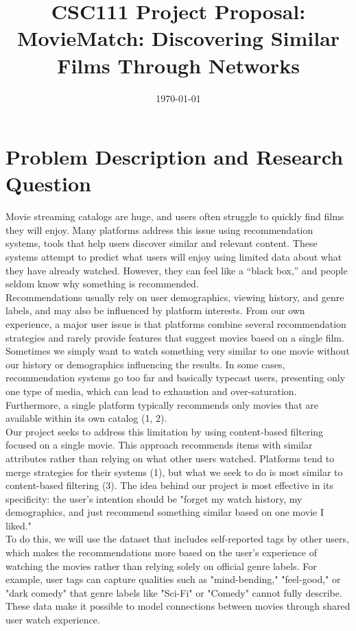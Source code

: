\documentclass[fontsize=11pt]{article}
\title{CSC111 Project Proposal:\\
\color{violet}\textbf{MovieMatch: Discovering Similar Films Through Networks}}
\date{\today}
\begin{document}
\maketitle

\section*{Problem Description and Research Question}

Movie streaming catalogs are huge, and users often struggle to quickly find films they will enjoy. Many platforms address this issue using recommendation systems, tools that help users discover similar and relevant content. These systems attempt to predict what users will enjoy using limited data about what they have already watched. However, they can feel like a “black box,” and people seldom know why something is recommended. \\

Recommendations usually rely on user demographics, viewing history, and genre labels, and may also be influenced by platform interests. From our own experience, a major user issue is that platforms combine several recommendation strategies and rarely provide features that suggest movies based on a single film. Sometimes we simply want to watch something very similar to one movie without our history or demographics influencing the results. In some cases, recommendation systems go too far and basically typecast users, presenting only one type of media, which can lead to exhaustion and over-saturation. Furthermore, a single platform typically recommends only movies that are available within its own catalog (1, 2). \\

Our project seeks to address this limitation by using content-based filtering focused on a single movie. This approach recommends items with similar attributes rather than relying on what other users watched. Platforms tend to merge strategies for their systems (1), but what we seek to do is most similar to content-based filtering (3). The idea behind our project is most effective in its specificity: the user’s intention should be "forget my watch history, my demographics, and just recommend something similar based on one movie I liked." \\

To do this, we will use the dataset that includes self-reported tags by other users, which makes the recommendations more based on the user's experience of watching the movies rather than relying solely on official genre labels. For example, user tags can capture qualities such as "mind-bending," "feel-good," or "dark comedy" that genre labels like "Sci-Fi" or "Comedy" cannot fully describe. These data make it possible to model connections between movies through shared user watch experience.  \\
\end{document}
